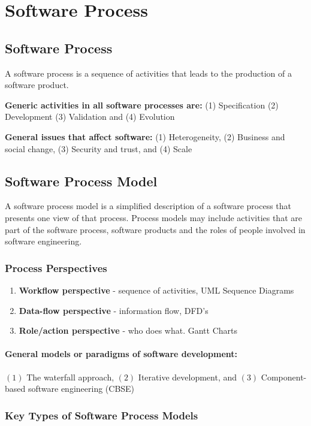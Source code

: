 \chapter{Software Process}



\section{Software Process}
A software process is a sequence of activities that leads to the production of a software product.

\textbf{Generic activities in all software processes are:}
(1) Specification (2) Development (3) Validation and (4) Evolution

\textbf{General issues that affect software:}
(1) Heterogeneity, (2) Business and social change, (3) Security and trust, and (4) Scale

\section{Software Process Model}
A software process model is a simplified description of a software process that presents one view of that process. Process models may include activities that are part of the software process, software products and the roles of people involved in software engineering.

\subsection{Process Perspectives}

\begin{enumerate}[itemsep=1ex]
   \item \textbf{Workflow perspective} - sequence of activities, UML Sequence Diagrams
   \item \textbf{Data-flow perspective} - information flow, DFD's
   \item \textbf{Role/action perspective} - who does what. Gantt Charts
\end{enumerate}

\subsubsection*{General models or paradigms of software development:}
$(\text{1})$ The waterfall approach, 
$(\text{2})$ Iterative development, and 
$(\text{3})$ Component-based software engineering (CBSE)


\subsection{Key Types of Software Process Models}

